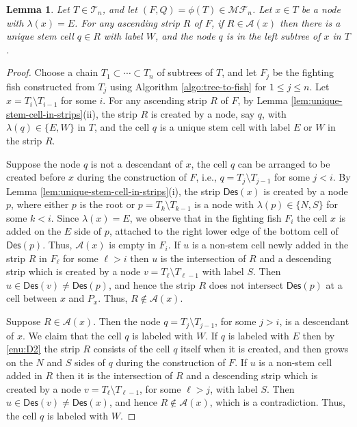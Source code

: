\documentclass[a4paper,11pt,reqno]{amsart}
\newtheorem{lem}{Lemma}[section]
\theoremstyle{definition}
\numberwithin{equation}{section}
\newcommand{\A}{{\mathcal{A}}}
\newcommand{\Des}{{\textsf{Des}}}
\newcommand{\MF}{{\mathcal{MF}}}
\newcommand{\T}{{\mathcal{T}}}
\begin{document}
\begin{lem} \label{lem:unique-W}
Let $T\in\T_n$, and let $(F,Q)=\phi(T)\in\MF_n$. Let $x\in T$ be a node with $\lambda(x)=E$. For any ascending strip $R$ of $F$, if $R\in\A(x)$ then there is a unique stem cell $q\in R$ with label $W$, and the node $q$ is in the left subtree of $x$ in $T$.
\end{lem}

\begin{proof} Choose a chain $T_1\subset \cdots\subset T_n$ of subtrees of $T$, and let $F_j$ be the fighting fish constructed from $T_j$ using Algorithm \ref{algo:tree-to-fish} for $1\le j\le n$. Let $x=T_i\setminus T_{i-1}$ for some $i$. For any ascending strip $R$ of $F$, by Lemma \ref{lem:unique-stem-cell-in-strips}(ii), the strip $R$ is created by a node, say $q$, with $\lambda(q)\in\{E,W\}$ in $T$, and the cell $q$ is a unique stem cell with label $E$ or $W$ in the strip $R$. 

Suppose the node $q$ is not a descendant of $x$, the cell $q$ can be arranged to be created before $x$ during the construction of $F$, i.e., $q=T_j\setminus T_{j-1}$ for some $j<i$. By Lemma \ref{lem:unique-stem-cell-in-strips}(i), the strip $\Des(x)$ is created by a node $p$, where either $p$ is the root or $p=T_k\setminus T_{k-1}$ is a node with $\lambda(p)\in\{N,S\}$ for some $k<i$. Since $\lambda(x)=E$, we observe that in the fighting fish $F_i$ the cell $x$ is added on the $E$ side of $p$,  attached to the right lower edge of the bottom cell of $\Des(p)$. Thus, $\A(x)$ is empty in $F_i$. If $u$ is a non-stem cell newly added in the strip $R$ in $F_{\ell}$ for some $\ell >i$ then $u$ is the intersection of $R$ and a descending strip which is created by a node $v=T_{\ell}\setminus T_{\ell-1}$ with label $S$. Then $u\in\Des(v)\neq\Des(p)$, and hence the strip $R$ does not intersect $\Des(p)$ at a cell between $x$ and $P_x$. Thus, $R\not\in\A(x)$.

Suppose $R\in\A(x)$. Then the node $q=T_j\setminus T_{j-1}$, for some $j>i$, is a descendant of $x$. We claim that the cell $q$ is labeled with $W$. If $q$ is labeled with $E$ then by \ref{enu:D2} the strip $R$ consists of the cell $q$ itself when it is created, and then grows on the $N$ and $S$ sides of $q$ during the construction of $F$. 
If $u$ is a non-stem cell added in $R$ then it is the intersection of $R$ and a descending strip which is created by a node $v=T_{\ell}\setminus T_{\ell-1}$, for some $\ell>j$, with label $S$. Then $u\in\Des(v)\neq\Des(x)$, and hence $R\not\in\A(x)$, which is a contradiction. Thus, the cell $q$ is labeled with $W$.


\end{proof}
\end{document}
